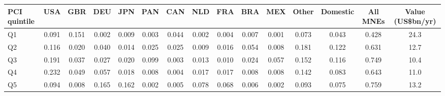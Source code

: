 \begin{tabular}{lcccccccccccccc}
\toprule
PCI quintile & USA & GBR & DEU & JPN & PAN & CAN & NLD & FRA & BRA & MEX & Other & Domestic & All MNEs & Value (US\$bn/yr) \\
\midrule
Q1 & 0.091 & 0.151 & 0.002 & 0.009 & 0.003 & 0.044 & 0.002 & 0.004 & 0.007 & 0.001 & 0.073 & 0.043 & 0.428 & 24.3 \\
Q2 & 0.116 & 0.020 & 0.040 & 0.014 & 0.025 & 0.025 & 0.009 & 0.016 & 0.054 & 0.008 & 0.181 & 0.122 & 0.631 & 12.7 \\
Q3 & 0.191 & 0.037 & 0.027 & 0.020 & 0.099 & 0.003 & 0.013 & 0.010 & 0.024 & 0.057 & 0.152 & 0.116 & 0.749 & 10.4 \\
Q4 & 0.232 & 0.049 & 0.057 & 0.018 & 0.008 & 0.004 & 0.017 & 0.017 & 0.008 & 0.008 & 0.142 & 0.083 & 0.643 & 11.0 \\
Q5 & 0.094 & 0.008 & 0.165 & 0.162 & 0.002 & 0.005 & 0.078 & 0.068 & 0.006 & 0.002 & 0.093 & 0.075 & 0.759 & 13.2 \\
\bottomrule
\end{tabular}
